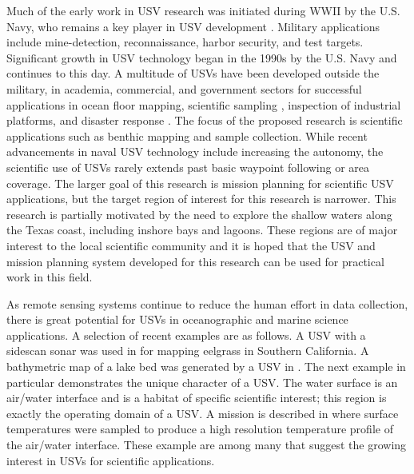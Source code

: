 \documentclass{tamuccthesis}
\begin{document}
Much of the early work in USV research was initiated during WWII by the U.S. Navy, who remains a key player in USV development \cite{bertram2008unmanned}. Military applications include mine-detection, reconnaissance, harbor security, and test targets. Significant growth in USV technology began in the 1990s by the U.S. Navy and continues to this day. A multitude of USVs have been developed outside the military, in academia, commercial, and government \cite{manley2008unmanned} sectors for successful applications in ocean floor mapping, scientific sampling \cite{cokelet2015use}, inspection of industrial platforms, and disaster response \cite{murphy2009robot}. The focus of the proposed research is scientific applications such as benthic mapping and sample collection. While recent advancements in naval USV technology include increasing the autonomy, the scientific use of USVs rarely extends past basic waypoint following or area coverage. The larger goal of this research is mission planning for scientific USV applications, but the target region of interest for this research is narrower. This research is partially motivated by the need to explore the shallow waters along the Texas coast, including inshore bays and lagoons. These regions are of major interest to the local scientific community and it is hoped that the USV and mission planning system developed for this research can be used for practical work in this field. 

As remote sensing systems continue to reduce the human effort in data collection, there is great potential for USVs in oceanographic and marine science applications. A selection of recent examples are as follows. A USV with a sidescan sonar was used in \cite{klemens2017development} for mapping eelgrass in Southern California. A bathymetric map of a lake bed was generated by a USV in \cite{watanabe2016field}. The next example in particular demonstrates the unique character of a USV. The water surface is an air/water interface and is a habitat of specific scientific interest; this region is exactly the operating domain of a USV. A mission is described in \cite{powers2017mobile} where surface temperatures were sampled to produce a high resolution temperature profile of the air/water interface. These example are among many that suggest the growing interest in USVs for scientific applications. 
\end{document}
